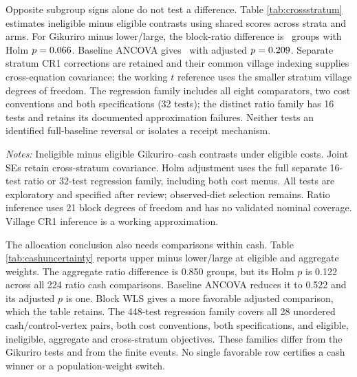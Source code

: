 \documentclass[11pt]{article}
\begin{document}
Opposite subgroup signs alone do not test a difference. Table \ref{tab:crossstratum} estimates ineligible minus eligible contrasts using shared scores across strata and arms. For Gikuriro minus lower/large, the block-ratio difference is \CrossRatioEstimate\ groups with Holm $p=0.066$. Baseline ANCOVA gives \CrossANCOVAEstimate\ with adjusted $p=0.209$. Separate stratum CR1 corrections are retained and their common village indexing supplies cross-equation covariance; the working $t$ reference uses the smaller stratum village degrees of freedom. The regression family includes all eight comparators, two cost conventions and both specifications (32 tests); the distinct ratio family has 16 tests and retains its documented approximation failures. Neither tests an identified full-baseline reversal or isolates a receipt mechanism.

\begin{table}[t]
\centering\caption{Direct cross-stratum differences with shared covariance}\label{tab:crossstratum}
\resizebox{\textwidth}{!}{}
\begin{minipage}{\textwidth}\footnotesize\emph{Notes:} Ineligible minus eligible Gikuriro--cash contrasts under eligible costs. Joint SEs retain cross-stratum covariance. Holm adjustment uses the full separate 16-test ratio or 32-test regression family, including both cost menus. All tests are exploratory and specified after review; observed-diet selection remains. Ratio inference uses 21 block degrees of freedom and has no validated nominal coverage. Village CR1 inference is a working approximation.\end{minipage}
\end{table}

The allocation conclusion also needs comparisons within cash. Table \ref{tab:cashuncertainty} reports upper minus lower/large at eligible and aggregate weights. The aggregate ratio difference is 0.850 groups, but its Holm $p$ is 0.122 across all 224 ratio cash comparisons. Baseline ANCOVA reduces it to 0.522 and its adjusted $p$ is one. Block WLS gives a more favorable adjusted comparison, which the table retains. The 448-test regression family covers all 28 unordered cash/control-vertex pairs, both cost conventions, both specifications, and eligible, ineligible, aggregate and cross-stratum objectives. These families differ from the Gikuriro tests and from the finite events. No single favorable row certifies a cash winner or a population-weight switch.
\end{document}

